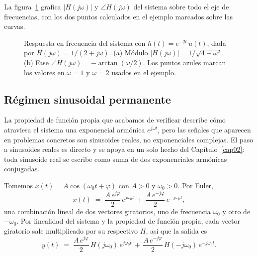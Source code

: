 \documentclass[class=book, crop=false]{standalone}
\begin{document}
La figura~\ref{fig:respuesta_frecuencia} grafica $|H(j\omega)|$ y $\angle H(j\omega)$ del sistema sobre todo el eje de frecuencias, con los dos puntos calculados en el ejemplo marcados sobre las curvas.

\begin{figure}[H]
    \centering
    \begin{minipage}{\linewidth}
        \centering
        
        \caption{Respuesta en frecuencia del sistema con $h(t) = e^{-2t}\,u(t)$, dada por $H(j\omega) = 1/(2 + j\omega)$. (a) Módulo $|H(j\omega)| = 1/\sqrt{4+\omega^2}$. (b) Fase $\angle H(j\omega) = -\arctan(\omega/2)$. Los puntos azules marcan los valores en $\omega = 1$ y $\omega = 2$ usados en el ejemplo.}
        \label{fig:respuesta_frecuencia}
    \end{minipage}
\end{figure}

\subsection{Régimen sinusoidal permanente}
\label{subsec:regimen_sinusoidal}

La propiedad de función propia que acabamos de verificar describe cómo atraviesa el sistema una exponencial armónica $e^{j\omega t}$, pero las señales que aparecen en problemas concretos son sinusoides reales, no exponenciales complejas. El paso a sinusoides reales es directo y se apoya en un solo hecho del Capítulo~\ref{cap02}: toda sinusoide real se escribe como suma de dos exponenciales armónicas conjugadas.

Tomemos $x(t) = A\cos(\omega_0 t + \varphi)$ con $A > 0$ y $\omega_0 > 0$. Por Euler,
\begin{equation*}
    x(t) \;=\; \frac{A\,e^{j\varphi}}{2}\,e^{j\omega_0 t} \,+\, \frac{A\,e^{-j\varphi}}{2}\,e^{-j\omega_0 t},
\end{equation*}
una combinación lineal de dos vectores giratorios, uno de frecuencia $\omega_0$ y otro de $-\omega_0$. Por linealidad del sistema y la propiedad de función propia, cada vector giratorio sale multiplicado por su respectivo $H$, así que la salida es
\begin{equation}
    y(t) \;=\; \frac{A\,e^{j\varphi}}{2}\,H(j\omega_0)\,e^{j\omega_0 t}
              \,+\, \frac{A\,e^{-j\varphi}}{2}\,H(-j\omega_0)\,e^{-j\omega_0 t}.
    \label{eq:salida_dos_terminos}
\end{equation}
\end{document}
